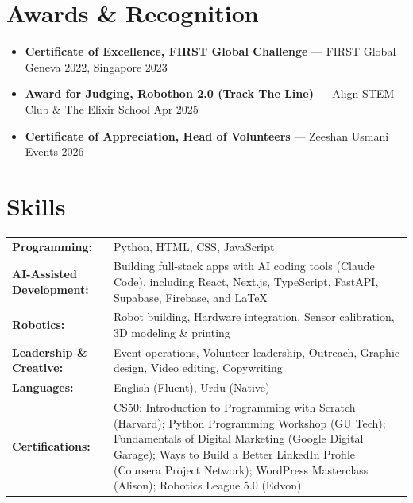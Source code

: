 \documentclass[10pt,a4paper]{article}
\begin{document}
\section{Awards \& Recognition}
\begin{itemize}
  \item \textbf{Certificate of Excellence, FIRST Global Challenge} --- FIRST Global \hfill Geneva 2022, Singapore 2023
  \item \textbf{Award for Judging, Robothon 2.0 (Track The Line)} --- Align STEM Club \& The Elixir School \hfill Apr 2025
  \item \textbf{Certificate of Appreciation, Head of Volunteers} --- Zeeshan Usmani Events \hfill 2026
\end{itemize}

\section{Skills}
\begin{tabularx}{\linewidth}{@{}l X@{}}
\textbf{Programming:} & Python, HTML, CSS, JavaScript \\
\textbf{AI-Assisted Development:} & Building full-stack apps with AI coding tools (Claude Code), including React, Next.js, TypeScript, FastAPI, Supabase, Firebase, and LaTeX \\
\textbf{Robotics:} & Robot building, Hardware integration, Sensor calibration, 3D modeling \& printing \\
\textbf{Leadership \& Creative:} & Event operations, Volunteer leadership, Outreach, Graphic design, Video editing, Copywriting \\
\textbf{Languages:} & English (Fluent), Urdu (Native) \\
\textbf{Certifications:} & CS50: Introduction to Programming with Scratch (Harvard); Python Programming Workshop (GU Tech); Fundamentals of Digital Marketing (Google Digital Garage); Ways to Build a Better LinkedIn Profile (Coursera Project Network); WordPress Masterclass (Alison); Robotics League 5.0 (Edvon) \\
\end{tabularx}
\end{document}
